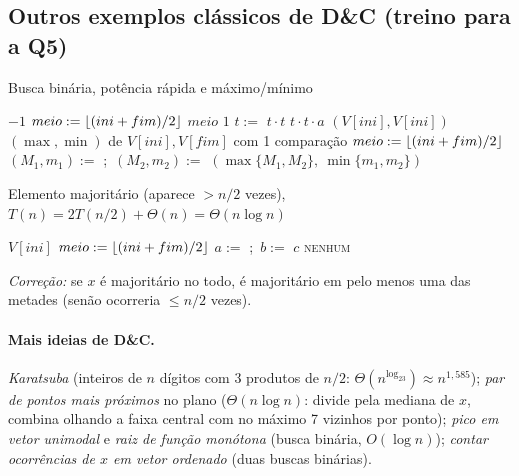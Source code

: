\subsection{Outros exemplos clássicos de D\&C (treino para a Q5)}
\begin{pseudo}{Busca binária, potência rápida e máximo/mínimo}
\begin{algorithmic}
 
   \State \Return $-1$ \EndIf
  \State $meio:=\lfloor(ini+fim)/2\rfloor$
   \State \Return $meio$
   \State \Return {}
  \Else \State \Return {}
  \EndIf
\EndFunction
{} 
   \State \Return $1$ \EndIf
  \State $t:=$ 
   \State \Return $t\cdot t$ \Else \State \Return $t\cdot t\cdot a$ \EndIf
\EndFunction
{} 
   \State \Return $(V[ini],V[ini])$ \EndIf
   \State \Return $(\max,\min)$ de $V[ini],V[fim]$ com 1 comparação \EndIf
  \State $meio:=\lfloor(ini+fim)/2\rfloor$
  \State $(M_1,m_1):=$ ;\ $(M_2,m_2):=$ 
  \State \Return $(\max\{M_1,M_2\},\ \min\{m_1,m_2\})$
\EndFunction
\end{algorithmic}
\end{pseudo}

\begin{pseudo}{Elemento majoritário (aparece $>n/2$ vezes), $T(n)=2T(n/2)+\Theta(n)=\Theta(n\log n)$}
\begin{algorithmic}
 
   \State \Return $V[ini]$ \EndIf
  \State $meio:=\lfloor(ini+fim)/2\rfloor$
  \State $a:=$ ;\ $b:=$ 
     \State \Return $c$ \EndIf {}
  \EndFor
  \State \Return \textsc{nenhum}
\EndFunction
\end{algorithmic}
\end{pseudo}
\emph{Correção:} se $x$ é majoritário no todo, é majoritário em pelo menos uma das metades (senão ocorreria $\le n/2$ vezes).

\paragraph{Mais ideias de D\&C.} \emph{Karatsuba} (inteiros de $n$ dígitos com 3 produtos de $n/2$: $\Theta(n^{\log_23})\approx n^{1{,}585}$); \emph{par de pontos mais próximos} no plano ($\Theta(n\log n)$: divide pela mediana de $x$, combina olhando a faixa central com no máximo 7 vizinhos por ponto); \emph{pico em vetor unimodal} e \emph{raiz de função monótona} (busca binária, $O(\log n)$); \emph{contar ocorrências de $x$ em vetor ordenado} (duas buscas binárias).

